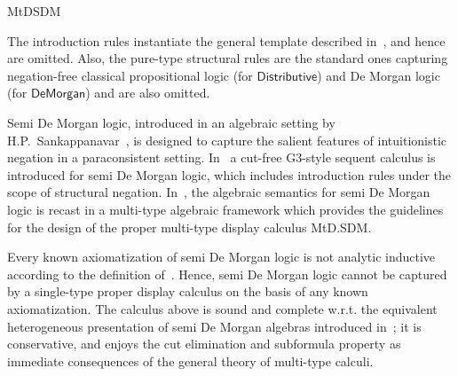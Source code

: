 \begin{entry}{MtDSDM}
\begin{clarifications}
  The introduction rules instantiate the general template described
  in~, and hence are omitted. Also, the pure-type structural rules are
  the standard ones capturing negation-free classical propositional logic (for
  $\mathsf{Distributive}$) and De Morgan logic (for $\mathsf{De Morgan}$) and are
  also omitted.
\end{clarifications}


\begin{history}
  Semi De Morgan logic, introduced in an algebraic setting by
  H.P.~Sankappanavar~\cite{sankappanavar1987semi}, is designed to capture the
  salient features of intuitionistic negation in a paraconsistent setting.
  In~\cite{ma2016sequent}  a cut-free G3-style sequent calculus is introduced for
  semi De Morgan logic, which includes introduction rules under the scope of
  structural negation. In~\cite{greco2017multi}, the algebraic semantics for semi
  De Morgan logic is recast in a multi-type algebraic framework which provides the
  guidelines for the design of the proper multi-type display calculus MtD.SDM.
\end{history}

\newcommand{\LHK}{\ensuremath{\mathbf{LHK}}\xspace}
\newcommand{\NK}{\ensuremath{\mathbf{NK}}\xspace}


\begin{technicalities}
  Every known axiomatization of semi De Morgan logic is not analytic inductive
  according to the definition of~\cite{greco2016unified}. Hence, semi De Morgan
  logic cannot be captured by a single-type proper display calculus on the basis
  of any known axiomatization. The calculus above is sound and complete w.r.t. the
  equivalent heterogeneous presentation of semi De Morgan algebras introduced
  in~\cite{greco2017multi}; it is conservative, and enjoys the cut elimination and
  subformula property as immediate consequences of the general theory of
  multi-type calculi.
\end{technicalities}

\end{entry} 
